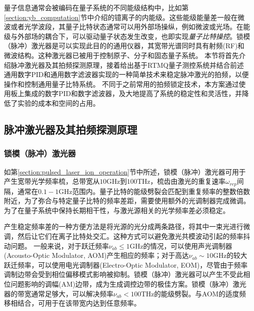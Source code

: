 量子信息通常会被编码在量子系统的不同能级结构中，比如第\ref{section:yb_computation}节中介绍的镱离子的内能级。这些能级能量差一般在微波或者光学波段，其量子比特状态通常可以用外部场操纵，例如微波或光场。在能级与外部场的耦合下，可以驱动量子状态发生改变，也即实现\emph{量子比特操控}。锁模（脉冲）激光器是可以实现此目的的通用仪器，其宽带光谱同时具有射频(RF)和微波结构。这种激光器已被用于控制原子\cite[]{Hayes_Matsukevich_Maunz_Hucul_Quraishi_Olmschenk_Campbell_Mizrahi_Senko_Monroe_2010}、分子\cite[]{Peer_Shapiro_Stowe_Shapiro_Ye_2007}和固态量子系统\cite[]{Greve_Press_McMahon_Yamamoto_2013}。
本节将首先介绍脉冲激光器及其拍频探测原理，接着给出基于RTMQ量子测控系统并结合前述通用数字PID和通用数字滤波器实现的一种简单技术来稳定脉冲激光的拍频，以便操作和控制通用量子比特系统\cite[]{ladd2010quantum}。
不同于之前常用的拍频锁定技术\cite[]{Islam_Campbell_Choi_Clark_Conover_Debnath_Edwards_Fields_Hayes_Hucul_et_al_2014}，本方案通过使用板上集成的数字PID和数字滤波器，及大地提高了系统的稳定性和灵活性，并降低了实验的成本和空间的占用。


\subsection[脉冲激光器及其拍频探测原理]{脉冲激光器及其拍频探测原理}
\subsubsection[锁模（脉冲）激光器]{锁模（脉冲）激光器}
如第\ref{section:pulsed_laser_ion_operation}节中所述，锁模（脉冲）激光器可用于产生宽带光学频率梳，总带宽从$10$GHz到$100 $THz，梳齿由激光的重复速率$\omega_{rep}$间隔，通常在$0.1-1 $GHz范围内。量子比特的能级劈裂会匹配到重复频率的整数倍数附近，为了弥合与特定量子比特的频率差距，需要使用额外的光调制器完成微调\cite[]{Hayes_Matsukevich_Maunz_Hucul_Quraishi_Olmschenk_Campbell_Mizrahi_Senko_Monroe_2010}。为了在量子系统中保持长期相干性，与激光源相关的光学频率差必须稳定\cite[]{Stick_Hensinger_Olmschenk_Madsen_Schwab_Monroe_2006}。

产生稳定频率差的一种方便方法是将光源的光分成两条路径，将其中一束光进行微调，然后让它们在离子比特处交汇。这种方式可以避免激光共模波动引起的频率抖动问题\cite[]{Thomas_Hemmer_Ezekiel_Leiby_Picard_Willis_2002}。
一般来说，对于跃迁频率$\nu_{ab}\leq 1$GHz的情况，可以使用声光调制器(Acousto-Optic Modulator, AOM)产生相应的频率；对于高达$\nu_{ab} \sim 10 $GHz的较大跃迁频率，可以使用电光调制器(Electro-Optic Modulator, EOM)，尽管由于频率调制边带会受到相位偏移模式影响被抑制\cite[]{Lee_Blinov_Brickman_Deslauriers_Madsen_Miller_Moehring_Stick_Monroe_2003}。锁模（脉冲）激光器可以产生不受此相位问题影响的调幅(AM)边带，成为生成调控边带的极佳方案。锁模（脉冲）激光器的带宽通常足够大，可以解决频率$\nu_{ab} < 100 $THz的能级劈裂。与AOM的适度频移相结合，可用于在该带宽内达到任意频率。

